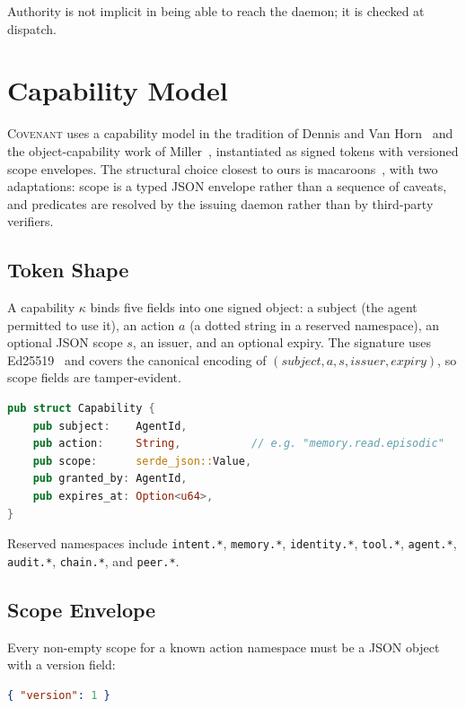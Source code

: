 \documentclass[11pt]{article}
\theoremstyle{plainsmall}
\begin{document}
Authority is not implicit in being able to reach the daemon; it is checked at dispatch.

\section{Capability Model}
\label{sec:caps}

\textsc{Covenant} uses a capability model in the tradition of Dennis and Van Horn~\cite{dennis1966} and the object-capability work of Miller~\cite{miller2006}, instantiated as signed tokens with versioned scope envelopes. The structural choice closest to ours is macaroons~\cite{macaroons}, with two adaptations: scope is a typed JSON envelope rather than a sequence of caveats, and predicates are resolved by the issuing daemon rather than by third-party verifiers.

\subsection{Token Shape}

A capability $\kappa$ binds five fields into one signed object: a subject (the agent permitted to use it), an action $a$ (a dotted string in a reserved namespace), an optional JSON scope $s$, an issuer, and an optional expiry. The signature uses Ed25519~\cite{ed25519} and covers the canonical encoding of $(subject, a, s, issuer, expiry)$, so scope fields are tamper-evident.

\begin{lstlisting}[language=rs]
pub struct Capability {
    pub subject:    AgentId,
    pub action:     String,           // e.g. "memory.read.episodic"
    pub scope:      serde_json::Value,
    pub granted_by: AgentId,
    pub expires_at: Option<u64>,
}
\end{lstlisting}

Reserved namespaces include \texttt{intent.*}, \texttt{memory.*}, \texttt{identity.*}, \texttt{tool.*}, \texttt{agent.*}, \texttt{audit.*}, \texttt{chain.*}, and \texttt{peer.*}.

\subsection{Scope Envelope}

Every non-empty scope for a known action namespace must be a JSON object with a version field:

\begin{lstlisting}[language=json]
{ "version": 1 }
\end{lstlisting}
\end{document}
